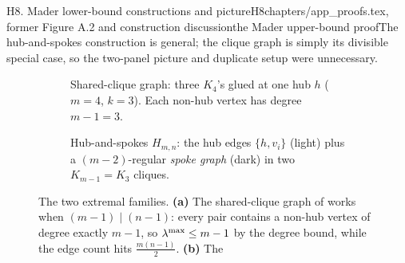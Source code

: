 \begin{offcutrewrite}{H8. Mader lower-bound constructions and picture}{H8}{chapters/app\_proofs.tex, former Figure A.2 and construction discussion}{the Mader upper-bound proof}{The hub-and-spokes construction is general; the clique graph is simply its divisible special case, so the two-panel picture and duplicate setup were unnecessary.}
\begin{figure}[htbp]
\centering
\begin{subfigure}[b]{0.46\textwidth}
\centering
{}
\caption{Shared-clique graph: three $K_4$'s glued at one hub $h$
($m=4$, $k=3$). Each non-hub vertex has degree $m-1=3$.}
\label{fig:shared-clique}
\end{subfigure}\hfill
\begin{subfigure}[b]{0.50\textwidth}
\centering
{}
\caption{Hub-and-spokes $H_{m,n}$: the hub edges $\{h,v_i\}$ (light) plus a
$(m-2)$-regular \emph{spoke graph} (dark) in two $K_{m-1}=K_3$ cliques.}
\label{fig:hub-spokes}
\end{subfigure}
\caption[Lower-bound constructions for Mader's theorem]{The two extremal
families. \textbf{(a)} The shared-clique graph of
 works when $(m-1)\mid(n-1)$: every pair contains a
non-hub vertex of degree exactly $m-1$, so $\lambda^{\max}\le m-1$ by the degree
bound, while the edge count hits $\tfrac{m(n-1)}{2}$. \textbf{(b)} The
}
\end{figure}
\end{offcutrewrite}
